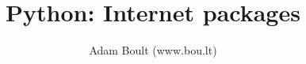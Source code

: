 \documentclass[oneside]{book}
\begin{document}
\author{Adam Boult (www.bou.lt)}
\title{Python: Internet packages}
\maketitle

\setcounter{tocdepth}{0}
\tableofcontents


\end{document}
